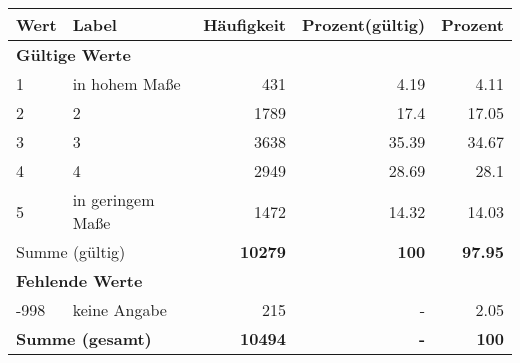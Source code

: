      \begin{longtable}{lXrrr}
     \toprule
     \textbf{Wert} & \textbf{Label} & \textbf{Häufigkeit} & \textbf{Prozent(gültig)} & \textbf{Prozent} \\
     \endhead
     \midrule
     \multicolumn{5}{l}{\textbf{Gültige Werte}}\\

     1 &
     \multicolumn{1}{X}{ in hohem Maße   } &


       \num{431} &
       \num[round-mode=places,round-precision=2]{4.19} &
         \num[round-mode=places,round-precision=2]{4.11} \\

     2 &
     \multicolumn{1}{X}{ 2   } &


       \num{1789} &
       \num[round-mode=places,round-precision=2]{17.4} &
         \num[round-mode=places,round-precision=2]{17.05} \\

     3 &
     \multicolumn{1}{X}{ 3   } &


       \num{3638} &
       \num[round-mode=places,round-precision=2]{35.39} &
         \num[round-mode=places,round-precision=2]{34.67} \\

     4 &
     \multicolumn{1}{X}{ 4   } &


       \num{2949} &
       \num[round-mode=places,round-precision=2]{28.69} &
         \num[round-mode=places,round-precision=2]{28.1} \\

     5 &
     \multicolumn{1}{X}{ in geringem Maße   } &


       \num{1472} &
       \num[round-mode=places,round-precision=2]{14.32} &
         \num[round-mode=places,round-precision=2]{14.03} \\
     \midrule
     \multicolumn{2}{l}{Summe (gültig)} &
       \textbf{\num{10279}} &
     \textbf{\num{100}} &
       \textbf{\num[round-mode=places,round-precision=2]{97.95}} \\
     \multicolumn{5}{l}{\textbf{Fehlende Werte}}\\
       -998 &
       keine Angabe &
         \num{215} &
        - &
         \num[round-mode=places,round-precision=2]{2.05} \\
     \midrule
     \multicolumn{2}{l}{\textbf{Summe (gesamt)}} &
          \textbf{\num{10494}} &
        \textbf{-} &
        \textbf{\num{100}} \\
     \bottomrule
     \end{longtable}
     
